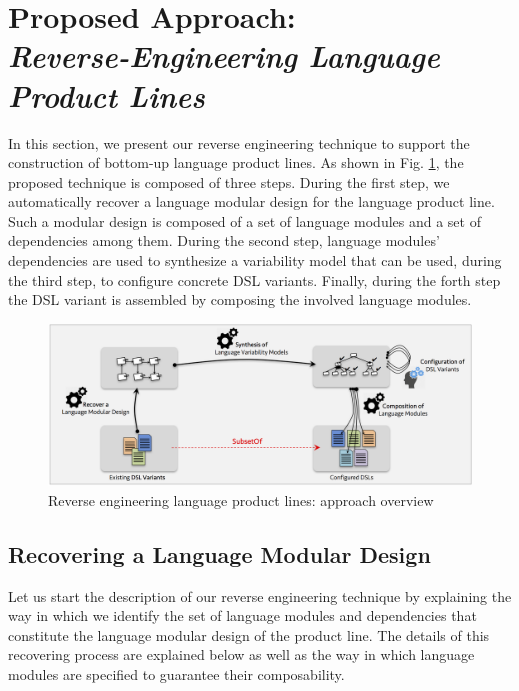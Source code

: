 \section{Proposed Approach: \\ \textit{Reverse-Engineering Language Product Lines}}
\label{sec:approach}

In this section, we present our reverse engineering technique to support the construction of bottom-up language product lines. As shown in Fig. \ref{fig:reverse-engineering}, the proposed technique is composed of three steps. During the first step, we automatically recover a language modular design for the language product line. Such a modular design is composed of a set of language modules and a set of dependencies among them. During the second step, language modules' dependencies are used to synthesize a variability model that can be used, during the third step, to configure concrete DSL variants. Finally, during the forth step the DSL variant is assembled by composing the involved language modules. 

\begin{figure}
\centering
\includegraphics[width=1\linewidth]{images/reverse-engineering-overview.png}
\caption{Reverse engineering language product lines: approach overview}
\label{fig:reverse-engineering}
\end{figure}

\subsection{Recovering a Language Modular Design}
\label{sec:reverseengineeringmodules}

Let us start the description of our reverse engineering technique by explaining the way in which we identify the set of language modules and dependencies that constitute the language modular design of the product line. The details of this recovering process are explained below as well as the way in which language modules are specified to guarantee their composability. 

